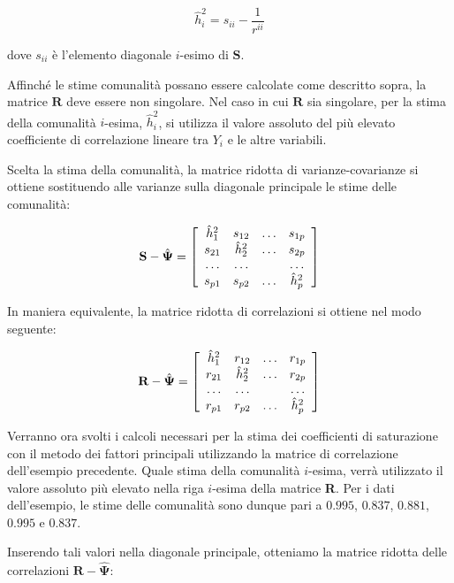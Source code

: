 \documentclass[
  11pt,
]{krantz}
\theoremstyle{definition}
\theoremstyle{definition}
\theoremstyle{definition}
\theoremstyle{definition}
\theoremstyle{remark}
\begin{document}
\[\hat{h}_i^2=s_{ii}-\frac{1}{r^{ii}}\]

dove \(s_{ii}\) è l'elemento diagonale \(i\)-esimo di \(\textbf{S}\).

Affinché le stime comunalità possano essere calcolate come descritto sopra, la matrice \(\textbf{R}\) deve essere non singolare. Nel caso in cui \(\textbf{R}\) sia singolare, per la stima della comunalità \(i\)-esima, \(\hat{h}^2_i\), si utilizza il valore assoluto del più elevato coefficiente di correlazione lineare tra \(Y_i\) e le altre variabili.

Scelta la stima della comunalità, la matrice ridotta di varianze-covarianze si ottiene sostituendo alle varianze sulla diagonale principale le stime delle comunalità:

\[
\textbf{S} - \hat{\boldsymbol{\Psi}} = 
\left[
  \begin{array}{ c c c c }
    \hat{h}^2_1 & s_{12} & \dots & s_{1p} \\
    s_{21} & \hat{h}^2_2 & \dots & s_{2p} \\
    \dots & \dots &           & \dots\\
    s_{p1} &  s_{p2} & \dots & \hat{h}^2_p
  \end{array} 
\right]
\]

In maniera equivalente, la matrice ridotta di correlazioni si ottiene nel modo seguente:

\[
\textbf{R} - \hat{\boldsymbol{\Psi}} = 
\left[
  \begin{array}{ c c c c }
    \hat{h}^2_1 & r_{12} & \dots & r_{1p} \\
    r_{21} & \hat{h}^2_2 & \dots & r_{2p} \\
    \dots & \dots &           & \dots\\
    r_{p1} &  r_{p2} & \dots & \hat{h}^2_p
  \end{array} 
\right]
\]

Verranno ora svolti i calcoli necessari per la stima dei coefficienti di saturazione con il metodo dei fattori principali utilizzando la matrice di correlazione dell'esempio precedente. Quale stima della comunalità \(i\)-esima, verrà utilizzato il valore assoluto più elevato nella riga \(i\)-esima della matrice \textbf{R}. Per i dati dell'esempio, le stime delle comunalità sono dunque pari a \(0.995\), \(0.837\), \(0.881\), \(0.995\) e \(0.837\).

Inserendo tali valori nella diagonale principale, otteniamo la matrice ridotta delle correlazioni \(\textbf{R} - \hat{\boldsymbol{\Psi}}\):
\end{document}
